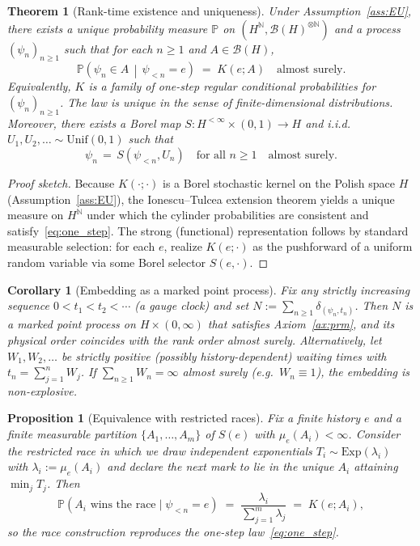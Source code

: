 \documentclass[12pt,a4paper]{article}
\newtheorem{proposition}{Proposition}
\newtheorem{theorem}{Theorem}
\newtheorem{corollary}{Corollary}
\begin{document}
\begin{theorem}[Rank-time existence and uniqueness]\label{thm:eu}
Under Assumption~\ref{ass:EU}, there exists a unique probability measure $\mathbb P$ on $(H^{\mathbb N},
\mathcal B(H)^{\otimes\mathbb N})$ and a process $(\psi_n)_{n\ge 1}$ such that for each $n\ge 1$ and $A\in\mathcal B(H)$,
\begin{equation}\label{eq:one_step}
    \mathbb P\!\left(\psi_n\in A \,\middle|\, \psi_{<n}=e\right)\;=\;K(e;A)\quad\text{almost surely.}
\end{equation}
Equivalently, $K$ is a family of one-step regular conditional probabilities for $(\psi_n)_{n\ge 1}$.
The law is unique in the sense of finite-dimensional distributions.
Moreover, there exists a Borel map $S:H^{<\infty}\times(0,1)\to H$ and i.i.d.\ $U_1,U_2,\dots\sim\mathrm{Unif}(0,1)$ such that
\begin{equation}
    \psi_n\,=\,S(\psi_{<n},U_n)\quad\text{for all }n\ge 1\quad\text{almost surely.}
\end{equation}
\end{theorem}

\begin{proof}[Proof sketch]
Because $K(\cdot;\cdot)$ is a Borel stochastic kernel on the Polish space $H$ (Assumption~\ref{ass:EU}),
the Ionescu--Tulcea extension theorem yields a unique measure on $H^{\mathbb N}$ under which
the cylinder probabilities are consistent and satisfy~\eqref{eq:one_step}.
The strong (functional) representation follows by standard measurable selection:
for each $e$, realize $K(e;\cdot)$ as the pushforward of a uniform random variable via some Borel selector $S(e,\cdot)$.
\end{proof}

\begin{corollary}[Embedding as a marked point process]\label{cor:embedding}
Fix any strictly increasing sequence $0<t_1<t_2<\cdots$ (a \emph{gauge clock}) and set
$N:=\sum_{n\ge 1}\delta_{(\psi_n,t_n)}$.
Then $N$ is a marked point process on $H\times(0,\infty)$ that satisfies Axiom~\ref{ax:prm},
and its physical order coincides with the rank order almost surely.
Alternatively, let $W_1,W_2,\dots$ be strictly positive (possibly history-dependent) waiting times with
$t_n=\sum_{j=1}^n W_j$. If $\sum_{n\ge 1} W_n=\infty$ almost surely (e.g.\ $W_n\equiv 1$), the embedding is non-explosive.
\end{corollary}

\begin{proposition}[Equivalence with restricted races]\label{prop:race_equiv}
Fix a finite history $e$ and a finite measurable partition $\{A_1,\dots,A_m\}$ of $S(e)$ with $\mu_e(A_i)<\infty$.
Consider the \emph{restricted race} in which we draw independent exponentials $T_i\sim\mathrm{Exp}(\lambda_i)$ with
$\lambda_i:=\mu_e(A_i)$ and declare the next mark to lie in the unique $A_i$ attaining $\min_j T_j$.
Then
\begin{equation}
    \mathbb P\!\left(\text{$A_i$ wins the race}\mid \psi_{<n}=e\right)\;=\;\frac{\lambda_i}{\sum_{j=1}^m \lambda_j}
    \;=\;K(e;A_i),
\end{equation}
so the race construction reproduces the one-step law~\eqref{eq:one_step}.
\end{proposition}
\end{document}
